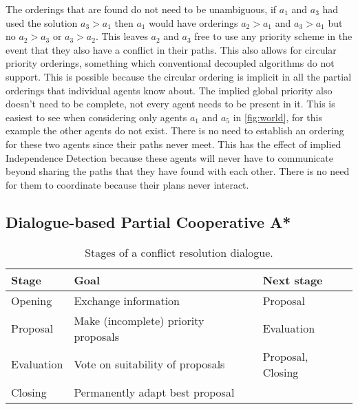 The orderings that are found do not need to be unambiguous, if $a_1$ and $a_3$
had used the solution $a_3 > a_1$ then $a_1$ would have orderings $a_2 > a_1$
and $a_3 > a_1$ but no $a_2 > a_3$ or $a_3 > a_2$. This leaves $a_2$ and $a_3$
free to use any priority scheme in the event that they also have a conflict in
their paths. This also allows for circular priority orderings, something which
conventional decoupled algorithms do not support. This is possible because the
circular ordering is implicit in all the partial orderings that individual
agents know about. The implied global priority also doesn't need to be
complete, not every agent needs to be present in it. This is easiest to see
when considering only agents $a_1$ and $a_5$ in \autoref{fig:world}, for this
example the other agents do not exist. There is no need to establish an
ordering for these two agents since their paths never meet. This has the effect
of implied Independence Detection \cite{standley2010} because these agents will
never have to communicate beyond sharing the paths that they have found with
each other. There is no need for them to coordinate because their plans never
interact.


\subsection{Dialogue-based Partial Cooperative A*}
\begin{table}
    \centering
    \caption{Stages of a conflict resolution dialogue.}
    \label{tbl:stages}
    \begin{tabular}{l|l|l}
        Stage & Goal & Next stage \\ \hline
        Opening & Exchange information & Proposal \\
        Proposal & Make (incomplete) priority proposals & Evaluation \\
        Evaluation & Vote on suitability of proposals & Proposal, Closing \\
        Closing & Permanently adapt best proposal & \\
    \end{tabular}
\end{table}

